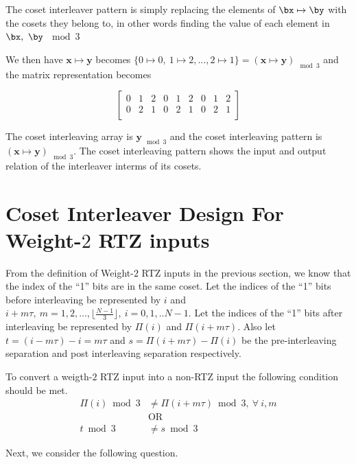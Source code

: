 \documentclass[11pt, oneside, dvipdfmx]{book}
\begin{document}
The coset interleaver pattern is simply replacing the elements of $\bx \mapsto \by$ with the cosets they belong to, in other words finding the value of each element in $\bx,~\by$ $\bmod 3$ 

  We then have $\mathbf{x} \mapsto \mathbf{y}$ becomes $\{0 \mapsto 0,~1 \mapsto 2,...,2 \mapsto 1 \} = (\mathbf{x} \mapsto \mathbf{y})_{\mod 3}$ and the matrix representation becomes
  
  $$  
 \begin{bmatrix}
0 & 1 & 2 & 0 & 1 & 2 & 0 & 1 & 2 \\
0 & 2 & 1 & 0 & 2 & 1 & 0 & 2 & 1 \\
\end{bmatrix}
$$
  

The coset interleaving array is $\mathbf{y}_{\mod 3}$ and the coset interleaving pattern is $(\mathbf{x} \mapsto \mathbf{y})_{\mod 3}$. The coset interleaving pattern shows the input and output relation of the interleaver interms of its cosets.

\section{Coset Interleaver Design For Weight-$2$ RTZ inputs}
From the definition of Weight-$2$ RTZ inputs in the previous section, we know that the index of the ``1'' bits are in the same coset. Let the indices of the ``1'' bits before interleaving be represented by $i$ and $i+m\tau ,~m=1,2,...,\lfloor \frac{N-1}{3} \rfloor,~i=0,1,..N-1$. Let the indices of the ``1'' bits after interleaving be represented by $\Pi(i)$ and $\Pi(i+m\tau)$. Also let $t=(i-m\tau) -i=m\tau$ and $s = \Pi(i+m\tau) - \Pi(i)$ be the pre-interleaving separation and post interleaving separation respectively.

To convert a weigth-$2$ RTZ input into a non-RTZ input the following condition should be met.
\begin{equation}
\begin{split}
 \Pi(i) \bmod 3 & \neq \Pi(i+m\tau) \bmod 3,~\forall ~i,m\\
 &\text{OR}\\
 t \bmod 3 &\neq s \bmod 3
 \end{split}
 \label{eq1}
\end{equation}

Next, we consider the following question.
\end{document}
